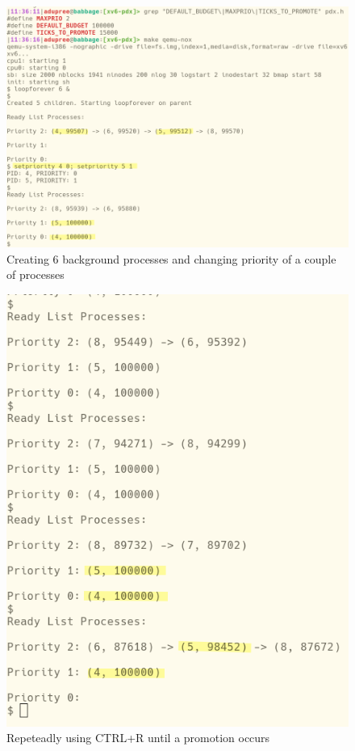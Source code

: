 \documentclass[11pt,letterpaper]{report}
\begin{document}
{  \begin{figure}[h!]
	\centering
	\includegraphics[width=1\linewidth]{maxprio-2-lists1.png}
	\caption[img]{Creating 6 background processes and changing priority of a couple of processes}
	\label{fig:P1compileP0-1}
  \end{figure}

  \begin{figure}[h!]
	\centering
	\includegraphics[width=1\linewidth]{maxprio-2-lists2.png}
	\caption[img]{Repeteadly using CTRL+R until a promotion occurs}
	\label{fig:P1compileP0-1}
  \end{figure}

}
\end{document}
